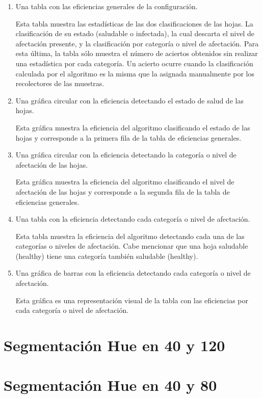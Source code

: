 \begin{enumerate}
\item Una tabla con las eficiencias generales de la configuración.

Esta tabla muestra las estadísticas de las dos clasificaciones de las hojas. La clasificación de su estado (saludable o infectada), la cual descarta el nivel de afectación presente, y la clasificación por categoría o nivel de afectación. Para esta última, la tabla sólo muestra el número de aciertos obtenidos sin realizar una estadística por cada categoría. Un acierto ocurre cuando la clasificación calculada por el algoritmo es la misma que la asignada manualmente por los recolectores de las muestras.

\item Una gráfica circular con la eficiencia detectando el estado de salud de las hojas.

Esta gráfica muestra la eficiencia del algoritmo clasificando el estado de las hojas y corresponde a la primera fila de la tabla de eficiencias generales.

\item Una gráfica circular con la eficiencia detectando la categoría o nivel de afectación de las hojas.

Esta gráfica muestra la eficiencia del algoritmo clasificando el nivel de afectación de las hojas y corresponde a la segunda fila de la tabla de eficiencias generales.

\item Una tabla con la eficiencia detectando cada categoría o nivel de afectación.

Esta tabla muestra la eficiencia del algoritmo detectando cada una de las categorías o niveles de afectación. Cabe mencionar que una hoja saludable (healthy) tiene una categoría también saludable (healthy).

\item Una gráfica de barras con la eficiencia detectando cada categoría o nivel de afectación.

Esta gráfica es una representación visual de la tabla con las eficiencias por cada categoría o nivel de afectación.
\end{enumerate}

\section{Segmentación Hue en 40 y 120}


\section{Segmentación Hue en 40 y 80}


